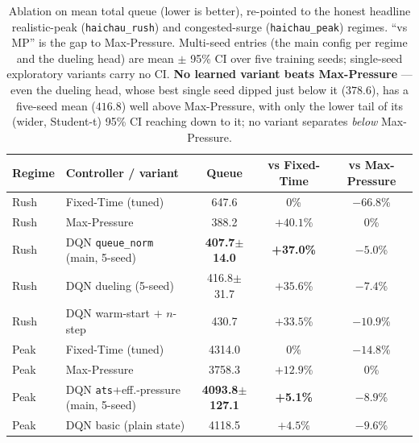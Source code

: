 \begin{table}[H]
\centering
\caption{Ablation on mean total queue (lower is better), re-pointed to the honest headline
realistic-peak (\texttt{haichau\_rush}) and congested-surge (\texttt{haichau\_peak}) regimes.
``vs MP'' is the gap to Max-Pressure. Multi-seed entries (the main config per regime and the
dueling head) are mean $\pm$ 95\% CI over five training seeds; single-seed exploratory variants
carry no CI. \textbf{No learned variant beats Max-Pressure} --- even the dueling head, whose best
single seed dipped just below it ($378.6$), has a five-seed mean ($416.8$) well above Max-Pressure,
with only the lower tail of its (wider, Student-t) 95\% CI reaching down to it; no variant separates
\emph{below} Max-Pressure.}
\label{tab:ablation}
\begin{tabular}{@{}llccc@{}}
\toprule
\textbf{Regime} & \textbf{Controller / variant} & \textbf{Queue} & \textbf{vs Fixed-Time} & \textbf{vs Max-Pressure} \\
\midrule
Rush & Fixed-Time (tuned)                           & 647.6 & 0\%       & $-66.8$\% \\
Rush & Max-Pressure                                 & 388.2 & $+40.1$\% & 0\% \\
Rush & DQN \texttt{queue\_norm} (main, 5-seed)      & \textbf{407.7$\pm$14.0} & \textbf{+37.0\%} & $-5.0$\% \\
Rush & DQN dueling (5-seed)                         & 416.8$\pm$31.7 & $+35.6$\% & $-7.4$\% \\
Rush & DQN warm-start $+$ $n$-step                  & 430.7 & $+33.5$\% & $-10.9$\% \\
\midrule
Peak & Fixed-Time (tuned)                           & 4314.0 & 0\%       & $-14.8$\% \\
Peak & Max-Pressure                                 & 3758.3 & $+12.9$\% & 0\% \\
Peak & DQN \texttt{ats}+eff.-pressure (main, 5-seed)& \textbf{4093.8$\pm$127.1} & \textbf{+5.1\%} & $-8.9$\% \\
Peak & DQN basic (plain state)                      & 4118.5 & $+4.5$\%  & $-9.6$\% \\
\bottomrule
\end{tabular}
\end{table}

